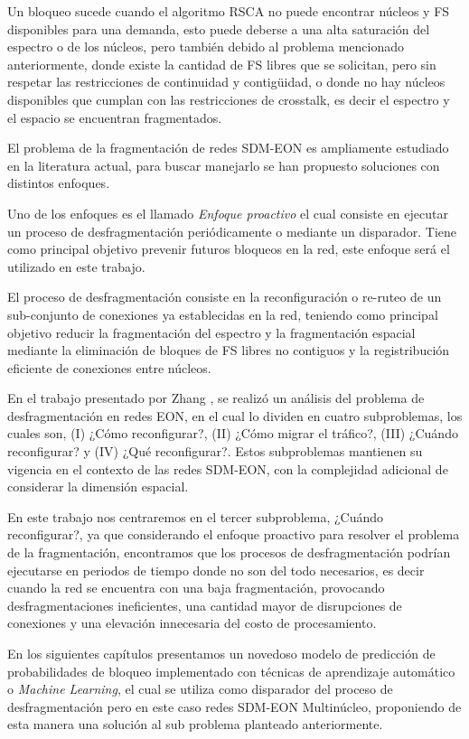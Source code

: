 Un bloqueo sucede cuando el algoritmo RSCA no puede encontrar núcleos y FS disponibles para una demanda, esto puede deberse a una alta saturación del espectro o de los núcleos, pero también debido al problema mencionado anteriormente, donde existe la cantidad de FS libres que se solicitan, pero sin respetar las restricciones de continuidad y contigüidad, o donde no hay núcleos disponibles que cumplan con las restricciones de crosstalk, es decir el espectro y el espacio se encuentran fragmentados.
%

El problema de la fragmentación de redes SDM-EON es ampliamente estudiado en la literatura actual, para buscar manejarlo se han propuesto soluciones con distintos enfoques.
%

% 

Uno de los enfoques es el llamado \textit{Enfoque proactivo} el cual consiste en ejecutar un proceso de desfragmentación periódicamente o mediante un disparador. Tiene como principal objetivo prevenir futuros bloqueos en la red, este enfoque será el utilizado en este trabajo.
%

El proceso de desfragmentación consiste en la reconfiguración o re-ruteo de un sub-conjunto de conexiones ya establecidas en la red, teniendo como principal objetivo reducir la fragmentación del espectro y la fragmentación espacial mediante la eliminación de bloques de FS libres no contiguos y la registribución eficiente de conexiones entre núcleos. 
%

En el trabajo presentado por Zhang \cite{zhang2014dynamic}, se realizó un análisis del problema de desfragmentación en redes EON, en el cual lo dividen en cuatro subproblemas, los cuales son, (I) ¿Cómo reconfigurar?, (II) ¿Cómo migrar el tráfico?, (III) ¿Cuándo reconfigurar? y (IV) ¿Qué reconfigurar?. Estos subproblemas mantienen su vigencia en el contexto de las redes SDM-EON, con la complejidad adicional de considerar la dimensión espacial.
%

En este trabajo nos centraremos en el tercer subproblema, ¿Cuándo reconfigurar?, ya que considerando el enfoque proactivo para resolver el problema de la fragmentación, encontramos que los procesos de desfragmentación podrían ejecutarse en periodos de tiempo donde no son del todo necesarios, es decir cuando la red se encuentra con una baja fragmentación, provocando desfragmentaciones ineficientes, una cantidad mayor de disrupciones de conexiones y una elevación innecesaria del costo de procesamiento.
%

En los siguientes capítulos presentamos un novedoso modelo de predicción de probabilidades de bloqueo implementado con técnicas de aprendizaje automático o \textit{Machine Learning}, el cual se utiliza como disparador del proceso de desfragmentación pero en este caso redes SDM-EON Multinúcleo, proponiendo de esta manera una solución al sub problema planteado anteriormente. 
%
